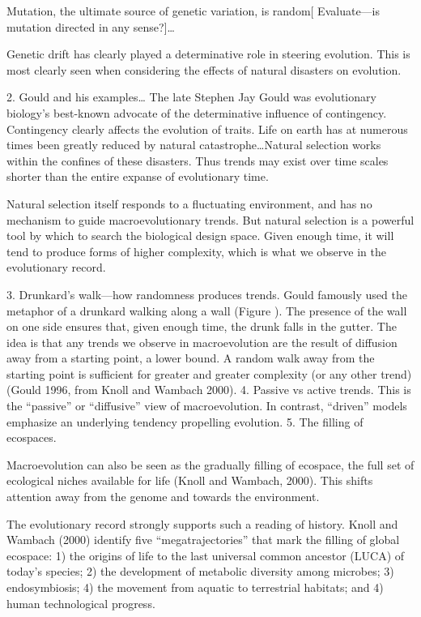 \documentclass{tufte-book} %
\begin{document}
Mutation, the ultimate source of genetic variation, is random[ Evaluate—is mutation directed in any sense?]…

Genetic drift has clearly played a determinative role in steering evolution. This is most clearly seen when considering the effects of natural disasters on evolution. 


2. Gould and his examples…
The late Stephen Jay Gould was evolutionary biology’s best-known advocate of the determinative influence of contingency. 
Contingency clearly affects the evolution of traits. Life on earth has at numerous times been greatly reduced by natural catastrophe…Natural selection works within the confines of these disasters. Thus trends may exist over time scales shorter than the entire expanse of evolutionary time. 



 Natural selection itself responds to a fluctuating environment, and has no mechanism to guide macroevolutionary trends. But natural selection is a powerful tool by which to search the biological design space. Given enough time, it will tend to produce forms of higher complexity, which is what we observe in the evolutionary record. 
 
3. Drunkard’s walk—how randomness produces trends. 
Gould famously used the metaphor of a drunkard walking along a wall (Figure ). The presence of the wall on one side ensures that, given enough time, the drunk falls in the gutter. The idea is that any trends we observe in macroevolution are the result of diffusion away from a starting point, a lower bound. A random walk away from the starting point is sufficient for greater and greater complexity (or any other trend) (Gould 1996, from Knoll and Wambach 2000). 
4. Passive vs active trends.
This is the “passive” or “diffusive” view of macroevolution. 
In contrast, “driven” models emphasize an underlying tendency propelling evolution. 
5. The filling of ecospaces.

Macroevolution can also be seen as the gradually filling of ecospace, the full set of ecological niches available for life (Knoll and Wambach, 2000). This shifts attention away from the genome and towards the environment. 

The evolutionary record strongly supports such a reading of history. Knoll and Wambach (2000) identify five “megatrajectories” that mark the filling of global ecospace: 1) the origins of life to the last universal common ancestor (LUCA) of today’s species; 2) the development of metabolic diversity among microbes; 3) endosymbiosis; 4) the movement from aquatic to terrestrial habitats; and 4) human technological progress. 
\end{document}
